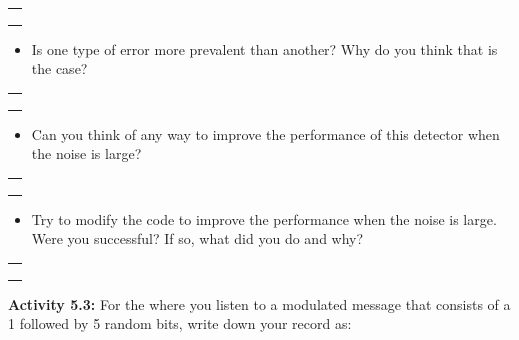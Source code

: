 \documentclass[11pt]{article}
\providecommand{\tightlist}{%
      \setlength{\itemsep}{0pt}\setlength{\parskip}{0pt}}
\begin{document}
\begin{longtable}[]{@{}l@{}}
\toprule
 \\
\midrule
\endhead
 \\
 \\
 \\
\bottomrule
\end{longtable}

\begin{itemize}
\tightlist
\item
  Is one type of error more prevalent than another? Why do you think
  that is the case?
\end{itemize}

\begin{longtable}[]{@{}l@{}}
\toprule
 \\
\midrule
\endhead
 \\
 \\
 \\
\bottomrule
\end{longtable}

\begin{itemize}
\tightlist
\item
  Can you think of any way to improve the performance of this detector
  when the noise is large?
\end{itemize}

\begin{longtable}[]{@{}l@{}}
\toprule
 \\
\midrule
\endhead
 \\
 \\
 \\
\bottomrule
\end{longtable}

\begin{itemize}
\tightlist
\item
  Try to modify the code to improve the performance when the noise is
  large. Were you successful? If so, what did you do and why?
\end{itemize}

\begin{longtable}[]{@{}l@{}}
\toprule
 \\
\midrule
\endhead
 \\
 \\
 \\
\bottomrule
\end{longtable}

\textbf{Activity 5.3:} For the where you listen to a modulated message
that consists of a 1 followed by 5 random bits, write down your record
as:
\end{document}
